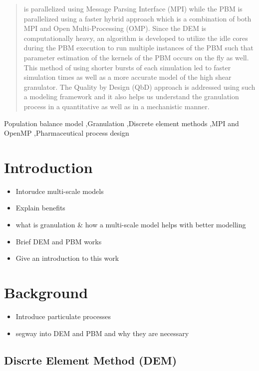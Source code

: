 \documentclass[preprint,11pt,authoryear]{elsarticle}
\begin{document}
\begin{frontmatter}
\begin{abstract}
is parallelized using Message Parsing Interface (MPI) while the PBM is parallelized using a faster
hybrid approach which is a combination of both MPI and Open Multi-Processing (OMP). Since
the DEM is computationally heavy, an algorithm is developed to utilize the idle cores during the
PBM execution to run multiple instances of the PBM such that parameter estimation of the kernels
of the PBM occurs on the fly as well. This method of using shorter bursts of each simulation led to
faster simulation times as well as a more accurate model of the high shear granulator. The Quality
by Design (QbD) approach is addressed using such a modeling framework and it also helps us
understand the granulation process in a quantitative as well as in a mechanistic manner. \citep{barrasso2015cerd}
\end{abstract}
\begin{keyword}
Population balance model \sep Granulation \sep Discrete element methods  \sep MPI and OpenMP 
\sep Pharmaceutical process design
\end{keyword}
\end{frontmatter}

\section{Introduction}

\begin{itemize}
\item{Intorudce multi-scale models}
\item{Explain benefits}
\item{what is granulation \& how a multi-scale model helps with better modelling}
\item{Brief DEM and PBM works}
\item{Give an introduction to this work}
\end{itemize}

\section{Background}
\begin{itemize}
\item{Introduce particulate processes}
\item{segway into DEM and PBM and why they are necessary}
\end{itemize}

\subsection{Discrte Element Method (DEM)}
\end{document}
